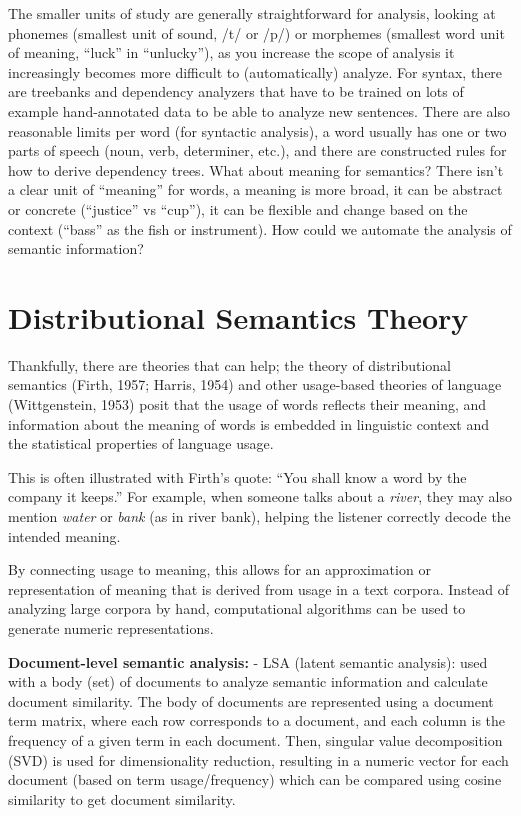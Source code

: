 The smaller units of study are generally straightforward for analysis, looking at phonemes (smallest unit of sound, /t/ or /p/) or morphemes (smallest word unit of meaning, ``luck'' in ``unlucky''), as you increase the scope of analysis it increasingly becomes more difficult to (automatically) analyze. For syntax, there are treebanks and dependency analyzers that have to be trained on lots of example hand-annotated data to be able to analyze new sentences. There are also reasonable limits per word (for syntactic analysis), a word usually has one or two parts of speech (noun, verb, determiner, etc.), and there are constructed rules for how to derive dependency trees. What about meaning for semantics? There isn't a clear unit of ``meaning'' for words, a meaning is more broad, it can be abstract or concrete (``justice'' vs ``cup''), it can be flexible and change based on the context (``bass'' as the fish or instrument). How could we automate the analysis of semantic information?

\section{Distributional Semantics Theory}


Thankfully, there are theories that can help; the theory of distributional semantics (Firth, 1957; Harris, 1954) and other usage-based theories of language (Wittgenstein, 1953) posit that the usage of words reflects their meaning, and information about the meaning of words is embedded in linguistic context and the statistical properties of language usage.

This is often illustrated with Firth's quote: ``You shall know a word by the company it keeps.''
For example, when someone talks about a \textit{river}, they may also mention \textit{water} or \textit{bank} (as in river bank), helping the listener correctly decode the intended meaning.

By connecting usage to meaning, this allows for an approximation or representation of meaning that is derived from usage in a text corpora. Instead of analyzing large corpora by hand, computational algorithms can be used to generate numeric representations.

\textbf{Document-level semantic analysis:}
- LSA (latent semantic analysis): used with a body (set) of documents to analyze semantic information and calculate document similarity. The body of documents are represented using a document term matrix, where each row corresponds to a document, and each column is the frequency of a given term in each document. Then, singular value decomposition (SVD) is used for dimensionality reduction, resulting in a numeric vector for each document (based on term usage/frequency) which can be compared using cosine similarity to get document similarity.

